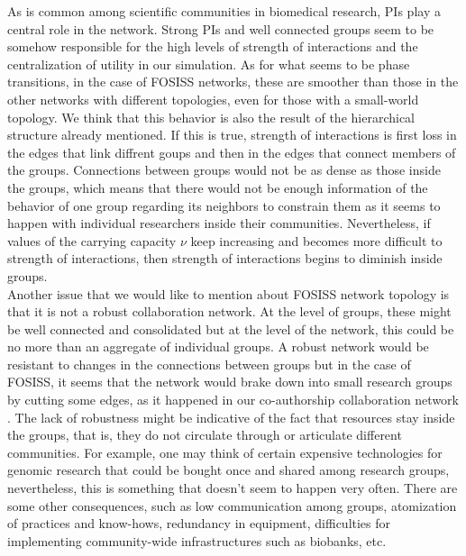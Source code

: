 \documentclass[11pt]{article}
\begin{document}
{{\color{red}As is common among scientific communities in biomedical research, PIs play a central role in the network. Strong PIs and
well connected groups seem to be somehow responsible for the high levels of strength of interactions and the centralization of utility in
our simulation. As for what seems to be phase transitions, in the case of FOSISS networks, these are smoother than
those in the other networks with different topologies, even for those with a small-world topology. We think that this
behavior is also the result of the hierarchical structure already mentioned. If this is true, strength of interactions is first loss in the
edges that link diffrent goups and then in the edges that connect members of the groups. Connections between groups would not
be as dense as those inside the groups, which means that there would not be enough information of the behavior of one group regarding
its neighbors to constrain them as it seems to happen with individual researchers inside their communities. Nevertheless,
if values of the carrying capacity $\nu$ keep increasing and becomes more
difficult to strength of interactions, then strength of interactions begins to diminish inside groups.}\\

{\color{red}Another issue that we would like to mention about FOSISS network topology is that it is not a robust collaboration network.
At the level of groups, these might be well connected and consolidated but at the level of the network, this could be
no more than an aggregate of individual groups. A robust network would be resistant to changes in the connections
between groups but in the case of FOSISS, it seems that the network would brake down into
small research groups by cutting some edges, as it happened in our co-authorship
collaboration network \cite{HernandezLemus2013}. The lack of robustness might be 
indicative of the fact that resources stay inside the groups, that is, they do not circulate through or articulate different communities. For
example, one may think of certain expensive technologies for genomic research that could be bought once and shared
among research groups, nevertheless, this is something that doesn't seem to happen very often. There are some other
consequences, such as low communication among groups, atomization of practices and know-hows, redundancy in equipment,
difficulties for implementing community-wide infrastructures such as biobanks, etc.}\\ 

}
\end{document}
